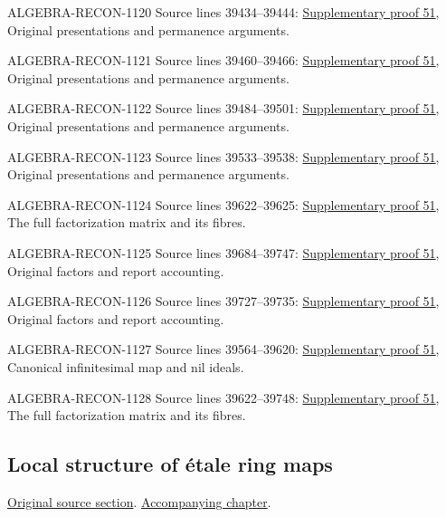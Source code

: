 \begin{AlgebraSourceRoutes}
\item[ALGEBRA-RECON-1120] Source lines 39434--39444: \hyperlink{algebra_etale_notes_20260928}{Supplementary proof 51}, Original presentations and permanence arguments.
\item[ALGEBRA-RECON-1121] Source lines 39460--39466: \hyperlink{algebra_etale_notes_20260928}{Supplementary proof 51}, Original presentations and permanence arguments.
\item[ALGEBRA-RECON-1122] Source lines 39484--39501: \hyperlink{algebra_etale_notes_20260928}{Supplementary proof 51}, Original presentations and permanence arguments.
\item[ALGEBRA-RECON-1123] Source lines 39533--39538: \hyperlink{algebra_etale_notes_20260928}{Supplementary proof 51}, Original presentations and permanence arguments.
\item[ALGEBRA-RECON-1124] Source lines 39622--39625: \hyperlink{algebra_etale_notes_20260928}{Supplementary proof 51}, The full factorization matrix and its fibres.
\item[ALGEBRA-RECON-1125] Source lines 39684--39747: \hyperlink{algebra_etale_notes_20260928}{Supplementary proof 51}, Original factors and report accounting.
\item[ALGEBRA-RECON-1126] Source lines 39727--39735: \hyperlink{algebra_etale_notes_20260928}{Supplementary proof 51}, Original factors and report accounting.
\item[ALGEBRA-RECON-1127] Source lines 39564--39620: \hyperlink{algebra_etale_notes_20260928}{Supplementary proof 51}, Canonical infinitesimal map and nil ideals.
\item[ALGEBRA-RECON-1128] Source lines 39622--39748: \hyperlink{algebra_etale_notes_20260928}{Supplementary proof 51}, The full factorization matrix and its fibres.
\end{AlgebraSourceRoutes}

\subsection{Local structure of \'etale ring maps}
\hypertarget{algebra-source-section-etale-local-structure}{}
\noindent\href{https://github.com/stacks/stacks-project/blob/a04446e57ec1fbc252a871afcec7752fb2807b14/algebra.tex\#L39754}{Original source section}. \href{algebra.pdf\#nameddest=section-etale-local-structure}{Accompanying chapter}.

